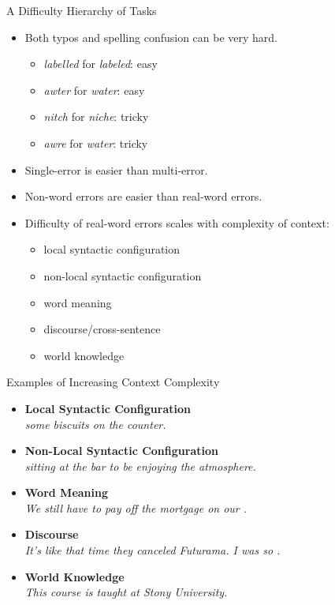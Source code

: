 \documentclass[professionalfonts, xcolor={usenames,svgnames,x11names,table}]{beamer}
\begin{document}
\begin{frame}{A Difficulty Hierarchy of Tasks}
    \begin{itemize}
        \item Both typos and spelling confusion can be very hard.\\
            \begin{itemize}
                \item \emph{labelled} for \emph{labeled}: easy
                \item \emph{awter} for \emph{water}: easy
                \item \emph{nitch} for \emph{niche}: tricky
                \item \emph{awre} for \emph{water}: tricky
            \end{itemize}
        \item Single-error is easier than multi-error.
        \item Non-word errors are easier than real-word errors.
        \item Difficulty of real-word errors scales with complexity of context: 
            \begin{itemize}
                \item local syntactic configuration
                \item non-local syntactic configuration
                \item word meaning
                \item discourse\slash cross-sentence
                \item world knowledge
            \end{itemize}
    \end{itemize}
\end{frame}
%
\begin{frame}{Examples of Increasing Context Complexity}
    \begin{itemize}
        \item \textbf{Local Syntactic Configuration}\\
              \emph{  some biscuits on the counter.}
        \item \textbf{Non-Local Syntactic Configuration}\\
              \emph{ sitting at the bar  to be enjoying the atmosphere.}
        \item \textbf{Word Meaning}\\
              \emph{We still have to pay off the mortgage on our .}
        \item \textbf{Discourse}\\
              \emph{It's like that time they canceled Futurama. I was so .}
        \item \textbf{World Knowledge}\\
              \emph{This course is taught at Stony  University.}
    \end{itemize}
\end{frame}
\end{document}
